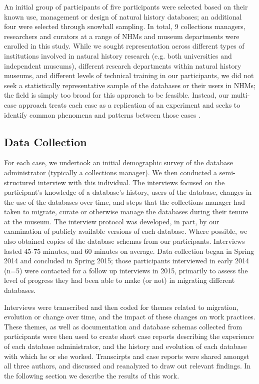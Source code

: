 An initial group of participants of five participants were selected based on their known use, management or design of natural history databases; an additional four were selected through snowball sampling. In total, 9 collections managers, researchers and curators at a range of NHMs and museum departments were enrolled in this study. While we sought representation across different types of institutions involved in natural history research (e.g. both universities and independent museums), different research departments within natural history museums, and different levels of technical training in our participants, we did not seek a statistically representative sample of the databases or their users in NHMs; the field is simply too broad for this approach to be feasible. Instead, our multi-case approach treats each case as a replication of an experiment and seeks to identify common phenomena and patterns between those cases \cite{yin2013case}. 

\subsection{Data Collection}

For each case, we undertook an initial demographic survey of the database administrator (typically a collections manager). We then conducted a semi-structured interview with this individual. The interviews focused on the participant's knowledge of a database's history, users of the database, changes in the use of the databases over time, and steps that the collections manager had taken to migrate, curate or otherwise manage the databases during their tenure at the museum. The interview protocol was developed, in part, by our examination of publicly available versions of each database. Where possible, we also obtained copies of the database schemas from our participants. Interviews lasted 45-75 minutes, and 60 minutes on average. Data collection began in Spring 2014 and concluded in Spring 2015; those participants interviewed in early 2014 (n=5) were contacted for a follow up interviews in 2015, primarily to assess the level of progress they had been able to make (or not) in migrating different databases. 

Interviews were transcribed and then coded for themes related to migration, evolution or change over time, and the impact of these changes on work practices. These themes, as well as documentation and database schemas collected from participants were then used to create short case reports describing the experience of each database administrator, and the history and evolution of each database with which he or she worked. Transcirpts and case reports were shared amongst all three authors, and discussed and reanalyzed to draw out relevant findings. In the following section we describe the results of this work.
